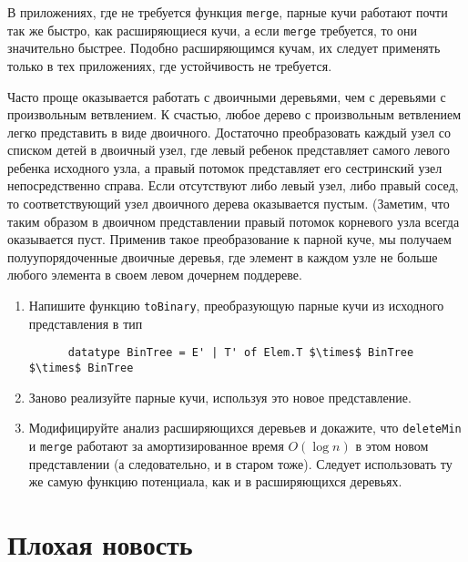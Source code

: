 \begin{hint}
  В приложениях, где не требуется функция \lstinline!merge!, парные
  кучи работают почти так же быстро, как расширяющиеся кучи, а если
  \lstinline!merge! требуется, то они значительно быстрее.  Подобно
  расширяющимся кучам, их следует применять только в тех приложениях,
  где устойчивость не требуется.
\end{hint}

\begin{exercise}\label{ex:5.8}
  Часто проще оказывается работать с двоичными деревьями, чем с деревьями с
  произвольным ветвлением. К счастью, любое дерево с произвольным
  ветвлением легко представить в виде двоичного. Достаточно
  преобразовать каждый узел со списком детей в двоичный узел, где левый ребенок
  представляет самого левого ребенка исходного узла, а правый
  потомок представляет его сестринский узел непосредственно
  справа. Если отсутствуют либо левый узел, либо правый сосед, то
  соответствующий узел двоичного дерева оказывается пустым. (Заметим,
  что таким образом в двоичном представлении правый потомок корневого
  узла всегда оказывается пуст. Применив такое преобразование к парной
  куче, мы получаем полуупорядоченные двоичные деревья, где элемент в
  каждом узле не больше любого элемента в своем левом дочернем
  поддереве. 
  \begin{enumerate}
  \item Напишите функцию \lstinline!toBinary!, преобразующую парные
    кучи из исходного представления в тип
    \begin{lstlisting}
      datatype BinTree = E' | T' of Elem.T $\times$ BinTree $\times$ BinTree
    \end{lstlisting}
  \item Заново реализуйте парные кучи, используя это новое представление.
  \item Модифицируйте анализ расширяющихся деревьев и докажите, что
    \lstinline!deleteMin! и \lstinline!merge! работают за
    амортизированное время $O(\log n)$ в этом новом представлении (а
    следовательно, и в старом тоже). Следует использовать ту же самую
    функцию потенциала, как и в расширяющихся деревьях.
  \end{enumerate}
\end{exercise}

\section{Плохая новость}
\label{sc:5.6}

